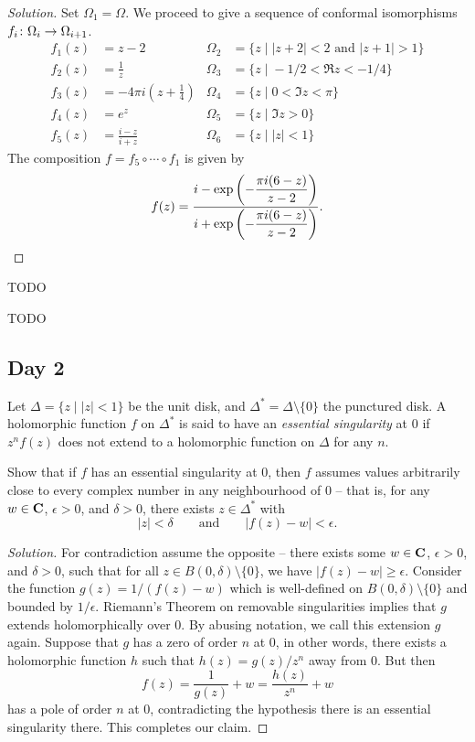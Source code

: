 \begin{proof}[Solution]
  Set $\Omega_1 = \Omega$. We proceed to give a sequence of conformal isomorphisms $f_i \colon \Omega_i \rightarrow \Omega_{i+1}$.
  \begin{align*}
    f_1(z) &= z-2 &
    \Omega_2 &= \{ z \;|\; |z+2| < 2 \textrm{ and } |z+1| > 1 \} \\
    f_2(z) &= \frac{1}{z} &
    \Omega_3 &= \{ z \;|\; -1/2 < \Re z < -1/4 \} \\
    f_3(z) &= -4 \pi i \left( z + \frac{1}{4} \right) &
    \Omega_4 &= \{ z \;|\; 0 < \Im z < \pi \} \\
    f_4(z) &= e^z &
    \Omega_5 &= \{ z \;|\; \Im z > 0 \} \\
    f_5(z) &= \frac{i-z}{i+z} &
    \Omega_6 &= \{ z \;|\; |z| < 1 \}
  \end{align*}
  The composition $f = f_5 \circ \cdots \circ f_1$ is given by
  \[
  f(z) = \frac{i - \displaystyle\exp\left( - \frac{\pi i (6-z)}{z-2} \right)}{i + \displaystyle\exp\left( - \frac{\pi i (6-z)}{z-2} \right)}. \qedhere
  \]
\end{proof}


TODO


TODO

\subsection{Day 2}
\label{S:fall-2009-2}
\mbox{}


Let $\Delta = \{ z \;|\; |z| < 1 \}$ be the unit disk, and $\Delta^\ast = \Delta \setminus \{0\}$ the punctured disk. A holomorphic function $f$ on $\Delta^\ast$ is said to have an \emph{essential singularity} at $0$ if $z^n f(z)$ does not extend to a holomorphic function on $\Delta$ for any $n$.

Show that if $f$ has an essential singularity at $0$, then $f$ assumes values arbitrarily close to every complex number in any neighbourhood of $0$ -- that is, for any $w \in \mathbf{C}$, $\epsilon > 0$, and $\delta > 0$, there exists $z \in \Delta^\ast$ with
\[
|z| < \delta
\qquad\textrm{and}\qquad
|f(z) - w| < \epsilon.
\]

\begin{proof}[Solution]
  For contradiction assume the opposite -- there exists some $w \in \mathbf{C}$, $\epsilon > 0$, and $\delta > 0$, such that for all $z \in B(0,\delta) \setminus \{0\}$, we have $|f(z) - w| \geq \epsilon$. Consider the function $g(z) = 1/(f(z) - w)$ which is well-defined on $B(0,\delta) \setminus \{0\}$ and bounded by $1/\epsilon$. Riemann's Theorem on removable singularities implies that $g$ extends holomorphically over $0$. By abusing notation, we call this extension $g$ again. Suppose that $g$ has a zero of order $n$ at $0$, in other words, there exists a holomorphic function $h$ such that $h(z) = g(z)/z^n$ away from $0$. But then
  \[
  f(z) = \frac{1}{g(z)} + w = \frac{h(z)}{z^n} + w
  \]
  has a pole of order $n$ at $0$, contradicting the hypothesis there is an essential singularity there. This completes our claim.
\end{proof}

